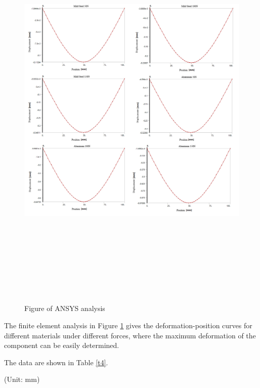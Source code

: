 \begin{figure}[htbp]
    \centering
    \includegraphics[width=18cm,height=20cm]{./fig/mix2.jpg}
    \caption{Figure of ANSYS analysis}
    \label{f2}
\end{figure}


The finite element analysis in Figure \ref{f2} gives the deformation-position 
curves for different materials under different forces, 
where the maximum deformation of the component can be easily determined.

The data are shown in Table \ref{t4}.

\begin{minipage}[htbp]{\textwidth}
    \makeatletter{}
    \centering
    
    (Unit: mm)
    \caption{FEA results - maximum deformation}
    \label{t4} 
\end{minipage}




